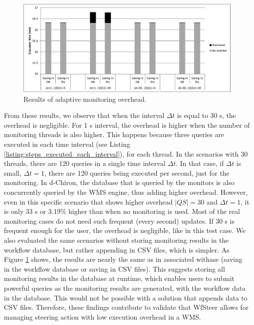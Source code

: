 \begin{figure}[H]
    \centering
    \includegraphics[width=\textwidth,keepaspectratio]{img/overhead-wms.pdf}
    \caption{Results of adaptive monitoring overhead.}
    \label{fig:adaptive_monitoring}
\end{figure}

From these results, we observe that when the interval $\Delta t$ is equal to
30 s, the overhead is negligible. For 1 s interval, the overhead is higher
when the number of monitoring threads is also higher. This happens
because three queries are executed in each time interval (see Listing \ref{listing:steps_executed_each_interval}),
for each thread. In the scenarios with 30 threads, there are 120
queries in a single time interval $\Delta t$.
 In that case, if $\Delta t$ is small, \eg{}
 $\Delta t = 1$, there are 120 queries being executed per
second, just for the monitoring.
In d-Chiron, the database that is queried by the
monitors is also concurrently queried by the WMS engine, thus adding
higher overhead. However, even in this specific scenario that shows
higher overhead $|QS|=30$ and $\Delta t=1$, it is only 33 s or
3.19\% higher than when no monitoring is used. Most of the real
monitoring cases do not need such frequent (every second) updates. If
30 s is frequent enough for the user, the overhead is negligible,
like in this test case. We also evaluated the same scenarios without
storing monitoring results in the workflow database, but rather appending in
CSV files, which is simpler. As Figure \ref{fig:adaptive_monitoring} shows, the results are nearly
the same as in associated withase (saving in the workflow database or saving in CSV
files). This suggests storing all monitoring results in the database
at runtime, which enables users to submit powerful queries as the
monitoring results are generated, with the workflow data in the database.  This
would not be possible with a solution that appends data to CSV files.
Therefore, these findings contribute to
validate that WfSteer allows for managing steering action with low execution overhead in a WMS.

